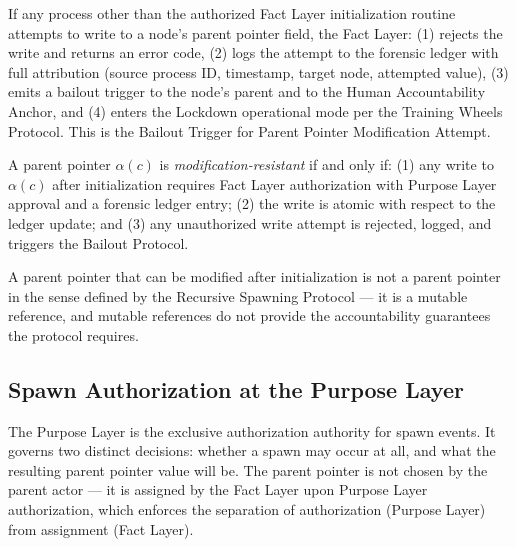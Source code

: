 If any process other than the authorized Fact Layer initialization routine attempts to write to a node's parent pointer field, the Fact Layer: (1) rejects the write and returns an error code, (2) logs the attempt to the forensic ledger with full attribution (source process ID, timestamp, target node, attempted value), (3) emits a bailout trigger to the node's parent and to the Human Accountability Anchor, and (4) enters the Lockdown operational mode per the Training Wheels Protocol. This is the Bailout Trigger for Parent Pointer Modification Attempt.

\begin{dfn}
\label{dfn:mod-resistance}
A parent pointer $\alpha(c)$ is \emph{modification-resistant} if and only if: (1) any write to $\alpha(c)$ after initialization requires Fact Layer authorization with Purpose Layer approval and a forensic ledger entry; (2) the write is atomic with respect to the ledger update; and (3) any unauthorized write attempt is rejected, logged, and triggers the Bailout Protocol.
\end{dfn}

A parent pointer that can be modified after initialization is not a parent pointer in the sense defined by the Recursive Spawning Protocol — it is a mutable reference, and mutable references do not provide the accountability guarantees the protocol requires.

\subsection{Spawn Authorization at the Purpose Layer}
\label{sec:spawn-authorization}

The Purpose Layer is the exclusive authorization authority for spawn events. It governs two distinct decisions: whether a spawn may occur at all, and what the resulting parent pointer value will be. The parent pointer is not chosen by the parent actor — it is assigned by the Fact Layer upon Purpose Layer authorization, which enforces the separation of authorization (Purpose Layer) from assignment (Fact Layer).

